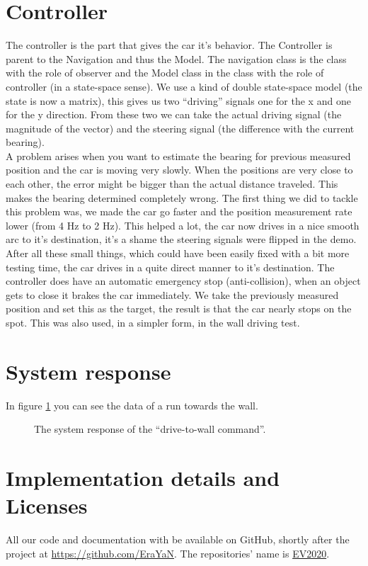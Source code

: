 \documentclass[final]{scrreprt} %
\begin{document}
\section{Controller}
The controller is the part that gives the car it's behavior.
The Controller is parent to the Navigation and thus the Model.
The navigation class is the class with the role of observer and the Model class in the class with the role of controller (in a state-space sense).
We use a kind of double state-space model (the state is now a matrix), this gives us two ``driving'' signals one for the x and one for the y direction.
From these two we can take the actual driving signal (the magnitude of the vector) and the steering signal (the difference with the current bearing).\\
A problem arises when you want to estimate the bearing for previous measured position and the car is moving very slowly. 
When the positions are very close to each other, the error might be bigger than the actual distance traveled. This makes the bearing determined completely wrong.
The first thing we did to tackle this problem was, we made the car go faster and the position measurement rate lower (from 4 Hz to 2 Hz).
This helped a lot, the car now drives in a nice smooth arc to it's destination, it's a shame the steering signals were flipped in the demo.\\
After all these small things, which could have been easily fixed with a bit more testing time, the car drives in a quite direct manner to it's destination.
The controller does have an automatic emergency stop (anti-collision), when an object gets to close it brakes the car immediately.
We take the previously measured position and set this as the target, the result is that the car nearly stops on the spot.
This was also used, in a simpler form, in the wall driving test.

\section{System response}
In figure \ref{fig:system-response} you can see the data of a run towards the wall.
\begin{figure}[H]
	\centering
    	\setlength\figureheight{4cm}
    	\setlength{}
    	    	
    	\caption{The system response of the “drive-to-wall command”.}
    	\label{fig:system-response}
\end{figure}

\section{Implementation details and Licenses}
All our code and documentation with be available on GitHub, shortly after the project at \href{https://github.com/EraYaN}{https://github.com/EraYaN}. The repositories' name is \href{https://github.com/EraYaN/EV2020}{EV2020}.\\
\end{document}
